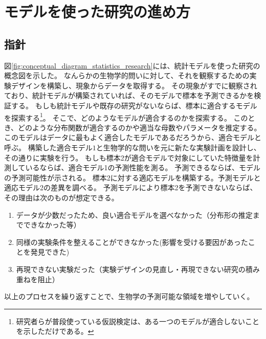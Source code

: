 \chapter{モデルを使った研究の進め方}

\section{指針}
図\ref{fig:conceptual_diagram_statistics_research}には、統計モデルを使った研究の概念図を示した。
なんらかの生物学的問いに対して、それを観察するための実験デザインを構築し、現象からデータを取得する。
その現象がすでに観察されており、統計モデルが構築されていれば、そのモデルで標本を予測できるかを検証する。
もしも統計モデルや既存の研究がないならば、標本に適合するモデルを探索する\footnote{研究者らが普段使っている仮説検定は、ある一つのモデルが適合しないことを示しただけである。}。
そこで、どのようなモデルが適合するのかを探索する。
このとき、どのような分布関数が適合するのかや適当な母数やパラメータを推定する。
このモデルはデータに最もよく適合したモデルであるだろうから、適合モデルと呼ぶ。
構築した適合モデル$1$と生物学的な問いを元に新たな実験計画を設計し、その通りに実験を行う。
もしも標本2が適合モデルで対象にしていた特徴量を計測しているならば、適合モデル1の予測性能を測る。
予測できるならば、モデルの予測可能性が示される。
標本2に対する適応モデルを構築する。予測モデルと適応モデル2の差異を調べる。
予測モデルにより標本2を予測できないならば、その理由は次のものが想定できる。
\begin{enumerate}
    \item データが少数だったため、良い適合モデルを選べなかった（分布形の推定までできなかった等）
    \item 同様の実験条件を整えることができなかった(影響を受ける要因があったことを発見できた)
    \item 再現できない実験だった（実験デザインの見直し・再現できない研究の積み重ねを阻止）
\end{enumerate}

以上のプロセスを繰り返すことで、生物学の予測可能な領域を増やしていく。

